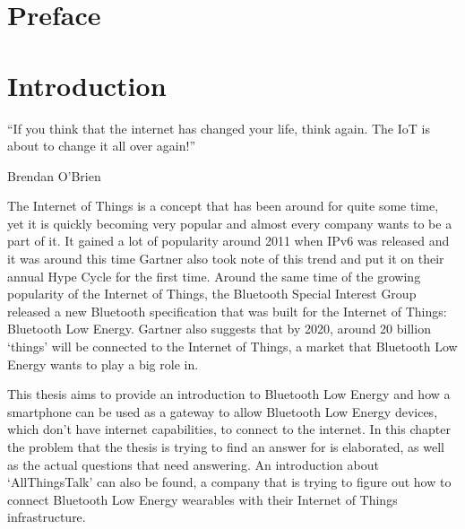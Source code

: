 \documentclass[pdftex,a4paper,12pt,twoside]{report}
\begin{document}
\begin{abstract}
\end{abstract}



\chapter*{Preface}
\label{ch:preface}


\tableofcontents



\chapter{Introduction}
\label{ch:introduction}
\epigraph{``If you think that the internet has changed your life, think again. The IoT is about to change it all over again!''}{Brendan O'Brien}
The Internet of Things is a concept that has been around for quite some time, yet it is quickly becoming very popular and almost every company wants to be a part of it. It gained a lot of popularity around 2011 when IPv6 was released and it was around this time Gartner \citep{gartner2012} also took note of this trend and put it on their annual Hype Cycle for the first time. Around the same time of the growing popularity of the Internet of Things, the Bluetooth Special Interest Group released a new Bluetooth specification that was built for the Internet of Things: Bluetooth Low Energy. Gartner \citep{gartner2015} also suggests that by 2020, around 20 billion `things' will be connected to the Internet of Things, a market that Bluetooth Low Energy wants to play a big role in.

This thesis aims to provide an introduction to Bluetooth Low Energy and how a smartphone can be used as a gateway to allow Bluetooth Low Energy devices, which don't have internet capabilities, to connect to the internet. In this chapter the problem that the thesis is trying to find an answer for is elaborated, as well as the actual questions that need answering. An introduction about `AllThingsTalk' can also be found, a company that is trying to figure out how to connect Bluetooth Low Energy wearables with their Internet of Things infrastructure.
\end{document}
